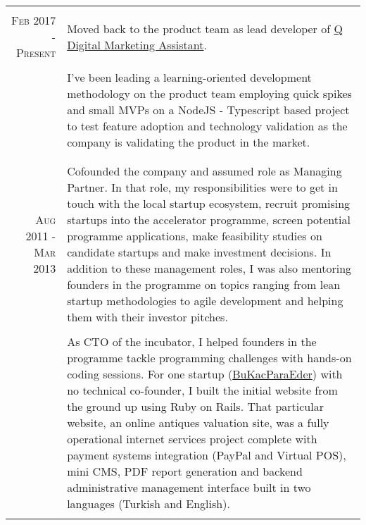 \documentclass[a4paper,10pt]{article}
\newcommand{\exptitle}[2]{
  \multicolumn{2}{l}{\textsc{#1} \footnotesize{#2}} \\
  \specialrule{.01em}{0.5em}{1em}
}
\begin{document}
\begin{longtable}{r|p{11cm}}
  \multicolumn{2}{c}{} \\
  \textsc{Feb 2017 - Present}   & Moved back to the product team as lead developer of \href{http://askq.io/}{Q Digital Marketing Assistant}. \\
                                & \\
   & I've been leading a learning-oriented development methodology on the product team employing quick spikes and small MVPs on a NodeJS - Typescript based project to test feature adoption and technology validation as the company is validating the product in the market. \\

  \multicolumn{2}{c}{} \\

  \newpage

  \exptitle{Enkuba}{Aug 2011 - Sep 2014}

  \textsc{Aug 2011 - Mar 2013}  & Cofounded the company and assumed role as Managing Partner. In that role, my responsibilities were to get in touch with the local startup ecosystem, recruit promising startups into the accelerator programme, screen potential programme applications, make feasibility studies on candidate startups and make investment decisions. In addition to these management roles, I was also mentoring founders in the programme on topics ranging from lean startup methodologies to agile development and helping them with their investor pitches. \\
                                & \\
                                & As CTO of the incubator, I helped founders in the programme tackle programming challenges with hands-on coding sessions. For one startup (\href{http://www.bukacparaeder.com}{BuKacParaEder}) with no technical co-founder, I built the initial website from the ground up using Ruby on Rails. That particular website, an online antiques valuation site, was a fully operational internet services project complete with payment systems integration (PayPal and Virtual POS), mini CMS, PDF report generation and backend administrative management interface built in two languages (Turkish and English). \\
  \multicolumn{2}{c}{} \\


\end{longtable}
\end{document}

